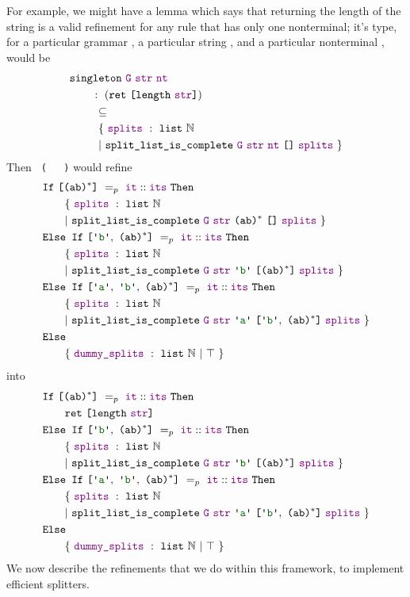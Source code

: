       For example, we might have a lemma  which says that returning the length of the string is a valid refinement for any rule that has only one nonterminal; it's type, for a particular grammar , a particular string , and a particular nonterminal , would be
\begin{align*}
& \fname{singleton}~\farg{G}~\farg{str}~\farg{nt} \\
& \qquad:~(\fname{ret}~\valuelist{\fname{length}~\farg{str}}) \\
&\qquad~\subseteq\\
&\ndcompfor[\phantom{:~}\qquad]{\nt{\farg{nt}}}{\nil}
\end{align*}
    Then \texttt{~(~\termhole~\termhole~)} would refine 
\begin{align*}
& \fname{If}~\valuelist{\nt{(ab)\ensuremath{^*}}}~=_p~\cons{\farg{it}}{\farg{its}}~\fname{Then} \\
&\ndcompfor[\qquad]{\nt{(ab)\ensuremath{^*}}}{\nil} \\
& \fname{Else~If}~\valuelist{\terminal{b},~\nt{(ab)\ensuremath{^*}}}~=_p~\cons{\farg{it}}{\farg{its}}~\fname{Then} \\
&\ndcompfor[\qquad]{\terminal{b}}{\valuelist{\nt{(ab)\ensuremath{^*}}}} \\
& \fname{Else~If}~\valuelist{\terminal{a},~\terminal{b},~\nt{(ab)\ensuremath{^*}}}~=_p~\cons{\farg{it}}{\farg{its}}~\fname{Then} \\
&\ndcompfor[\qquad]{\terminal{a}}{\valuelist{\terminal{b},~\nt{(ab)\ensuremath{^*}}}} \\
& \fname{Else} \\
&\qquad\{~\farg{dummy\_splits}~:~\indname{list}~\mathbb{N}~|~\True~\} \\
\end{align*}
into
\begin{align*}
& \fname{If}~\valuelist{\nt{(ab)\ensuremath{^*}}}~=_p~\cons{\farg{it}}{\farg{its}}~\fname{Then} \\
&\qquad\fname{ret}~\valuelist{\fname{length}~\farg{str}}\\
& \fname{Else~If}~\valuelist{\terminal{b},~\nt{(ab)\ensuremath{^*}}}~=_p~\cons{\farg{it}}{\farg{its}}~\fname{Then} \\
&\ndcompfor[\qquad]{\terminal{b}}{\valuelist{\nt{(ab)\ensuremath{^*}}}} \\
& \fname{Else~If}~\valuelist{\terminal{a},~\terminal{b},~\nt{(ab)\ensuremath{^*}}}~=_p~\cons{\farg{it}}{\farg{its}}~\fname{Then} \\
&\ndcompfor[\qquad]{\terminal{a}}{\valuelist{\terminal{b},~\nt{(ab)\ensuremath{^*}}}} \\
& \fname{Else} \\
&\qquad\{~\farg{dummy\_splits}~:~\indname{list}~\mathbb{N}~|~\True~\} \\
\end{align*}
    We now describe the refinements that we do within this framework, to implement efficient splitters.
    
